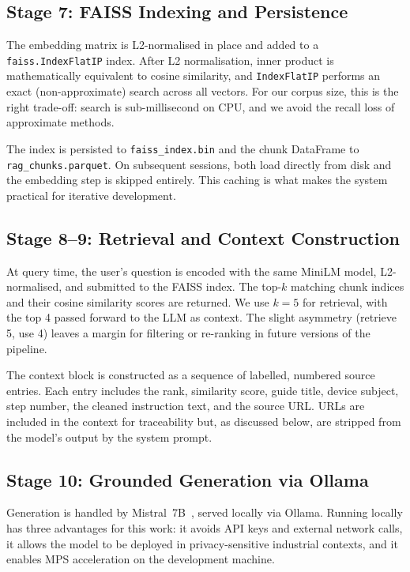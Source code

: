 \documentclass[journal,onecolumn]{IEEEtran}
\begin{document}
\subsection{Stage 7: FAISS Indexing and Persistence}

The embedding matrix is L2-normalised in place and added to a
\texttt{faiss.IndexFlatIP} index. After L2 normalisation, inner product is
mathematically equivalent to cosine similarity, and \texttt{IndexFlatIP}
performs an exact (non-approximate) search across all vectors. For our corpus
size, this is the right trade-off: search is sub-millisecond on CPU, and we
avoid the recall loss of approximate methods.

The index is persisted to \texttt{faiss\_index.bin} and the chunk DataFrame
to \texttt{rag\_chunks.parquet}. On subsequent sessions, both load directly
from disk and the embedding step is skipped entirely. This caching is what
makes the system practical for iterative development.

\subsection{Stage 8--9: Retrieval and Context Construction}

At query time, the user's question is encoded with the same MiniLM model,
L2-normalised, and submitted to the FAISS index. The top-$k$ matching chunk
indices and their cosine similarity scores are returned. We use $k = 5$ for
retrieval, with the top 4 passed forward to the LLM as context. The slight
asymmetry (retrieve 5, use 4) leaves a margin for filtering or re-ranking in
future versions of the pipeline.

The context block is constructed as a sequence of labelled, numbered source
entries. Each entry includes the rank, similarity score, guide title, device
subject, step number, the cleaned instruction text, and the source URL.
URLs are included in the context for traceability but, as discussed below,
are stripped from the model's output by the system prompt.

\subsection{Stage 10: Grounded Generation via Ollama}

Generation is handled by Mistral~7B~\cite{mistral2023}, served locally via
Ollama. Running locally has three advantages for this work: it avoids API
keys and external network calls, it allows the model to be deployed in
privacy-sensitive industrial contexts, and it enables MPS acceleration on
the development machine.
\end{document}
